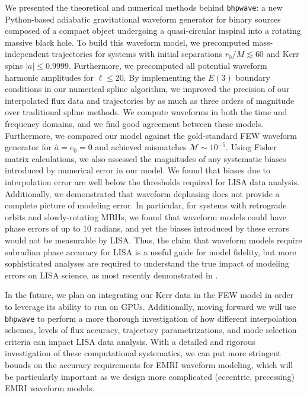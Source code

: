\documentclass[%
 reprint,
 nofootinbib,
 amsmath,amssymb,
 aps,
 prd,
]{revtex4-2}
\begin{document}
We presented the theoretical and numerical methods behind \texttt{bhpwave}: a new Python-based adiabatic gravitational waveform generator for binary sources composed of a compact object undergoing a quasi-circular inspiral into a rotating massive black hole. To build this waveform model, we precomputed mass-independent trajectories for systems with initial separations $r_0/M \lesssim 60$ and Kerr spins $|a| \leq 0.9999$. Furthermore, we precomputed all potential waveform harmonic amplitudes for $\ell \leq 20$. By implementing the $E(3)$ boundary conditions in our numerical spline algorithm, we improved the precision of our interpolated flux data and trajectories by as much as three orders of magnitude over traditional spline methods. We compute waveforms in both the time and frequency domains, and we find good agreement between these models. Furthermore, we compared our model against the gold-standard FEW waveform generator for $\hat{a} = e_0 = 0$ and achieved mismatches $\mathcal{M} \sim 10^{-5}$. Using Fisher matrix calculations, we also assessed the magnitudes of any systematic biases introduced by numerical error in our model. We found that biases due to interpolation error are well below the thresholds required for LISA data analysis. Additionally, we demonstrated that waveform dephasing does not provide a complete picture of modeling error. In particular, for systems with retrograde orbits and slowly-rotating MBHs, we found that waveform models could have phase errors of up to 10 radians, and yet the biases introduced by these errors would not be measurable by LISA. Thus, the claim that waveform models require subradian phase accuracy for LISA is a useful guide for model fidelity, but more sophisticated analyses are required to understand the true impact of modeling errors on LISA science, as most recently demonstrated in \cite{BurkETC23}.

In the future, we plan on integrating our Kerr data in the FEW model in order to leverage its ability to run on GPUs. Additionally, moving forward we will use \texttt{bhpwave} to perform a more thorough investigation of how different interpolation schemes, levels of flux accuracy, trajectory parametrizations, and mode selection criteria can impact LISA data analysis. With a detailed and rigorous investigation of these computational systematics, we can put more stringent bounds on the accuracy requirements for EMRI waveform modeling, which will be particularly important as we design more complicated (eccentric, precessing) EMRI waveform models.
\end{document}
